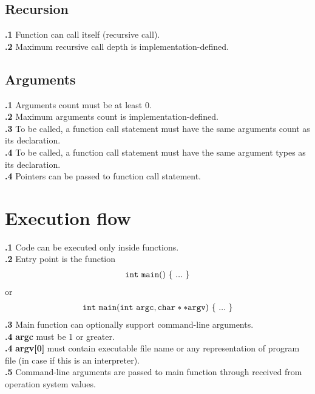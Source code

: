 \documentclass[leqno]{article}
\begin{document}
        \subsection{Recursion}
            \textbf{\thesubsection.1} Function can call itself (recursive call). \\
            \textbf{\thesubsection.2} Maximum recursive call depth is implementation-defined.

        \subsection{Arguments}
            \textbf{\thesubsection.1} Arguments count must be at least 0. \\
            \textbf{\thesubsection.2} Maximum arguments count is implementation-defined. \\
            \textbf{\thesubsection.3} To be called, a function call statement must have
            the same arguments count as its declaration. \\
            \textbf{\thesubsection.4} To be called, a function call statement must have
            the same argument types as its declaration. \\
            \textbf{\thesubsection.4} Pointers can be passed to function call statement.

    \section{Execution flow}
        \textbf{\thesubsection.1} Code can be executed only inside functions. \\
        \textbf{\thesubsection.2} Entry point is the function
            \begin{align*}
                \tt{int\ main()\ \{\ ...\ \}}
            \end{align*}
            or
            \begin{align*}
                \tt{int\ main(int\ argc, char **argv)\ \{\ ...\ \}}
            \end{align*}
        \textbf{\thesubsection.3} Main function can optionally support command-line
        arguments. \\
        \textbf{\thesubsection.4} \textbf{argc} must be 1 or greater. \\
        \textbf{\thesubsection.4} \textbf{argv[0]} must contain executable file name or any representation of program file (in case if this is an interpreter). \\
        \textbf{\thesubsection.5} Command-line arguments are passed to main function
        through received from operation system values.
\end{document}

